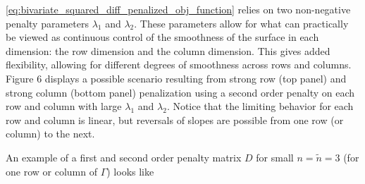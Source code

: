 \documentclass[12pt]{article}
\begin{document}
\ref{eq:bivariate_squared_diff_penalized_obj_function} relies on two non-negative penalty parameters $\lambda_1$ and $\lambda_2$. These parameters allow for what can practically be viewed as continuous control of the smoothness of the surface in each dimension: the row dimension and the column dimension. This gives added flexibility, allowing for different degrees of smoothness across rows and columns. Figure 6 displays a possible scenario resulting from strong row (top panel) and strong column (bottom panel) penalization using a second order penalty on each row and column with large $\lambda_1$ and $\lambda_2$. Notice that the limiting behavior for each row and column is linear, but reversals of slopes are possible from one row (or column) to the next.

An example of a first and second order penalty matrix $D$ for small $n = \tilde{n} = 3$ (for one row or column of $\Gamma$) looks like
\end{document}
